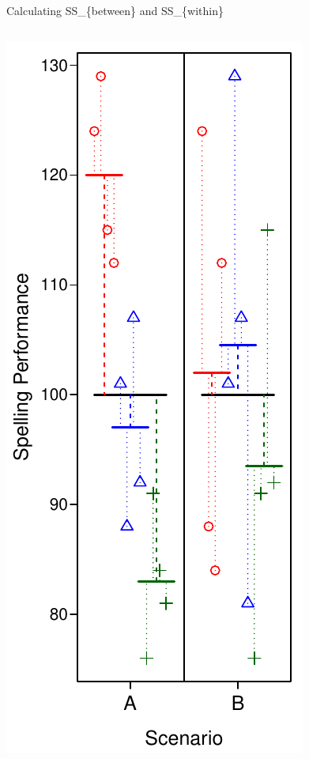 \documentclass[presentation]{beamer}
\begin{document}
\begin{frame}[label={sec:org8d4ad61}]{Calculating SS\_\{between\} and SS\_\{within\}}
\begin{columns}
\begin{column}{.25\columnwidth}
\includegraphics[scale=.5]{08_glm_img/spelling-05.pdf}
\end{column}


\end{columns}
\end{frame}
\end{document}
